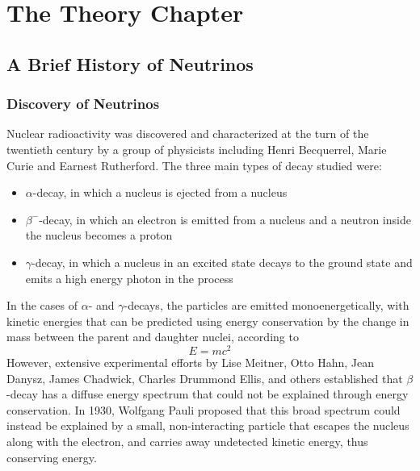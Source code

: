 \documentclass[/main.tex]{subfiles}
\begin{document}
\graphicspath{{./pics/}{ch1/pics/}}

\onlyinsubfile{\textpages}
\chapter{The Theory Chapter}

\section{A Brief History of Neutrinos}
\subsection{Discovery of Neutrinos}
Nuclear radioactivity was discovered and characterized at the turn of the twentieth century by a group of physicists including Henri Becquerrel, Marie Curie and Earnest Rutherford.
The three main types of decay studied were:
\begin{itemize}
\item $\alpha$-decay, in which a  nucleus is ejected from a nucleus
\item $\beta^-$-decay, in which an electron is emitted from a nucleus and a neutron inside the nucleus becomes a proton
\item $\gamma$-decay, in which a nucleus in an excited state decays to the ground state and emits a high energy photon in the process
\end{itemize}
In the cases of $\alpha$- and $\gamma$-decays, the particles are emitted monoenergetically, with kinetic energies that can be predicted using energy conservation by the change in mass between the parent and daughter nuclei, according to
\begin{equation}
  E=mc^2
\end{equation}
However, extensive experimental efforts by Lise Meitner, Otto Hahn, Jean Danysz, James Chadwick, Charles Drummond Ellis, and others established that $\beta$-decay has a diffuse energy spectrum that could not be explained through energy conservation.
In 1930, Wolfgang Pauli proposed that this broad spectrum could instead be explained by a small, non-interacting particle that escapes the nucleus along with the electron, and carries away undetected kinetic energy, thus conserving energy.
\end{document}

